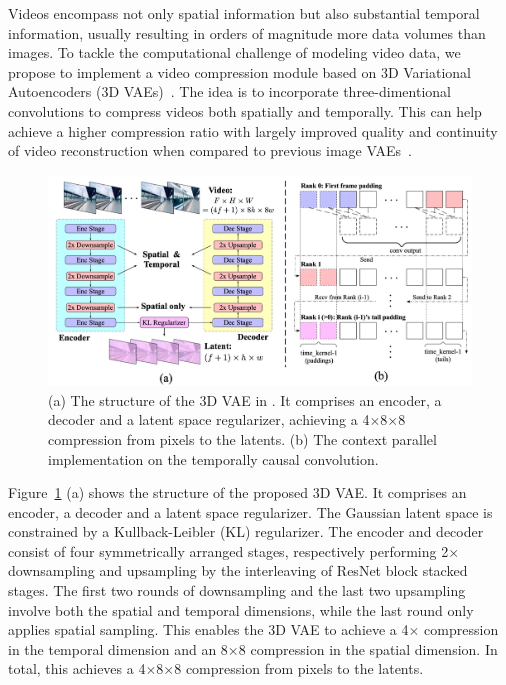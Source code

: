 
Videos encompass not only spatial information but also substantial temporal information, usually resulting in orders of magnitude more data volumes than images.  
To tackle the computational challenge of modeling video data, we propose to implement a video compression module based on 3D Variational Autoencoders (3D VAEs)~\citep{yu2023language}.
The idea is to incorporate three-dimentional convolutions to compress videos both spatially and temporally. 
This can help achieve a higher compression ratio with largely improved quality and continuity of video reconstruction when compared to previous image VAEs~\citep{rombach2022high, esser2021taming}. 
\begin{figure}[h]
\begin{center}
\includegraphics[width=\linewidth]{images/3dvae_combined.jpg}
\end{center}
\caption{(a) The structure of the 3D VAE in \model. It comprises an encoder, a decoder and a latent space regularizer, achieving a 4$\times$8$\times$8 compression from pixels to the latents. (b) The context parallel implementation on the temporally causal convolution.}
\label{fig:3dvae_combined}
\end{figure}

Figure~\ref{fig:3dvae_combined} (a) shows the structure of the proposed 3D VAE. 
It comprises an encoder, a decoder and a latent space regularizer. 
The Gaussian latent space is constrained by a Kullback-Leibler (KL) regularizer.
The encoder and decoder consist of four symmetrically arranged stages, respectively performing 2$\times$ downsampling and upsampling by the interleaving of ResNet block stacked stages. 
The first two rounds of downsampling and the last two upsampling involve both the spatial and temporal dimensions, while the last round only applies spatial sampling. 
This enables the 3D VAE to achieve a 4$\times$ compression in the temporal dimension and an 8$\times$8 compression in the spatial dimension. 
In total, this achieves a 4$\times$8$\times$8 compression from pixels to the latents. 

